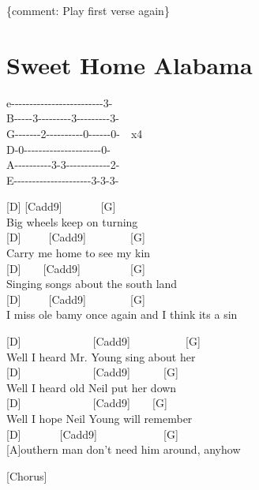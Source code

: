 \documentclass[
  letterpaper,
  twoside=false]{scrbook}
\begin{document}
\{comment: Play first verse again\}

\hypertarget{sweet-home-alabama}{%
\chapter{Sweet Home Alabama}\label{sweet-home-alabama}}

e\textbar-\/-\/-\/-\/-\/-\/-\/-\/-\/-\/-\/-\/-\/-\/-\/-\/-\/-\/-\/-\/-\/-\/-\/-\/-3-\textbar{}\\
B\textbar-\/-\/-\/-\/-3-\/-\/-\/-\/-\/-\/-\/-\/-3-\/-\/-\/-\/-\/-\/-\/-\/-3-\textbar{}\\
G\textbar-\/-\/-\/-\/-\/-\/-2-\/-\/-\/-\/-\/-\/-\/-\/-\/-0-\/-\/-\/-\/-\/-0-\textbar~~x4\\
D-0-\/-\/-\/-\/-\/-\/-\/-\/-\/-\/-\/-\/-\/-\/-\/-\/-\/-\/-\/-\/-0-\textbar~~~~~\\
A\textbar-\/-\/-\/-\/-\/-\/-\/-\/-\/-3-3-\/-\/-\/-\/-\/-\/-\/-\/-\/-\/-\/-2-\textbar{}\\
E\textbar-\/-\/-\/-\/-\/-\/-\/-\/-\/-\/-\/-\/-\/-\/-\/-\/-\/-\/-\/-\/-3-3-3-\textbar{}

{[}D{]} {[}Cadd9{]}~~~~~~~{[}G{]}\\
Big wheels keep on turning\\
{[}D{]}~~~~~{[}Cadd9{]}~~~~~~~~{[}G{]}\\
Carry me home to see my kin\\
{[}D{]}~~~~{[}Cadd9{]}~~~~~~~~~{[}G{]}\\
Singing songs about the south land\\
{[}D{]}~~~~~{[}Cadd9{]}~~~~~~~~{[}G{]}~~~~~~~~~~~~~~~~~~~~~~~~~~~\\
I miss \textquotesingle ole\textquotesingle{} \textquotesingle bamy once
again and I think it\textquotesingle s a sin

{[}D{]}~~~~~~~~~~~~~{[}Cadd9{]}~~~~~~~~~~{[}G{]}\\
Well I heard Mr. Young sing about her\\
{[}D{]}~~~~~~~~~~~~~{[}Cadd9{]}~~~~~~{[}G{]}\\
Well I heard old Neil put her down\\
{[}D{]}~~~~~~~~~~~~~{[}Cadd9{]}~~~~{[}G{]}\\
Well I hope Neil Young will remember\\
{[}D{]}~~~~~~~{[}Cadd9{]}~~~~~~~~~~~~{[}G{]}~~~~~~~~~~~~~~~\\
{[}A{]}outhern man don't need him around, anyhow

{[}Chorus{]}
\end{document}
